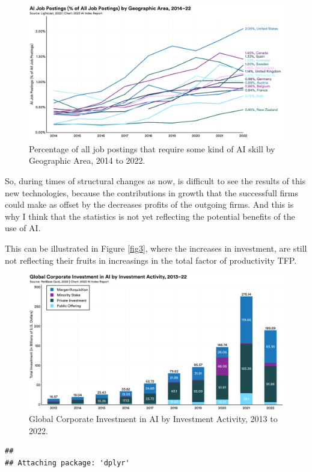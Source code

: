 \documentclass[preprint, 3p,
authoryear]{elsarticle} %
\begin{document}
\begin{figure}

{\centering \includegraphics[width=0.7\linewidth]{../Views/AI_job_postings_by_geo_area} 

}

\caption{\label{fig2} Percentage of all job postings that require some kind of AI skill by Geographic Area, 2014 to 2022.}\label{fig:fig2}
\end{figure}

So, during times of structural changes as now, is difficult to see the
results of this new technologies, because the contributions in growth
that the successfull firms could make as offset by the decreases profits
of the outgoing firms. And this is why I think that the statistics is
not yet reflecting the potential benefits of the use of AI.

This can be illustrated in Figure \ref{fig3}, where the increases in
investment, are still not reflecting their fruits in increasings in the
total factor of productivity TFP.

\begin{figure}

{\centering \includegraphics[width=0.7\linewidth]{../Views/global_investiment_by_inv_activity} 

}

\caption{\label{fig3}Global Corporate Investment in AI by Investment Activity, 2013 to 2022.}\label{fig:fig3}
\end{figure}

\begin{verbatim}
## 
## Attaching package: 'dplyr'
\end{verbatim}
\end{document}
